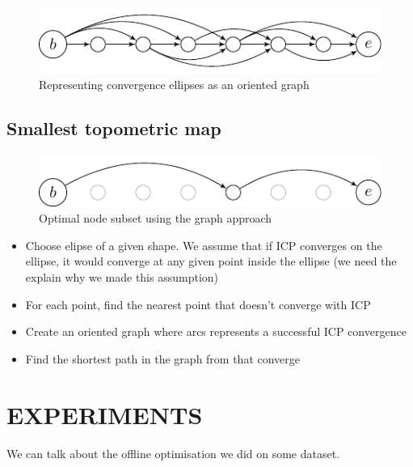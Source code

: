\documentclass[letterpaper,10 pt,conference]{ieeeconf}
\begin{document}
\begin{figure}[thpb]
  \centering
  \includegraphics[scale=1.0]{unoptimized-graph}
  \caption{Representing convergence ellipses as an oriented graph}
  \label{graph_unoptimized}
\end{figure}



\subsection{Smallest topometric map}

\begin{figure}[thpb]
  \centering
  \includegraphics[scale=1.0]{optimized-graph}
  \caption{Optimal node subset using the graph approach}
\end{figure}

\begin{itemize}
  \item Choose elipse of a given shape. We assume that if ICP converges on the
    ellipse, it would converge at any given point inside the ellipse (we need the explain why we made this assumption)

  \item For each point, find the nearest point that doesn't converge with ICP

  \item Create an oriented graph where arcs represents a successful ICP convergence

  \item Find the shortest path in the graph from that converge

\end{itemize}


\section{EXPERIMENTS}
We can talk about the offline optimisation we did on some dataset.
\end{document}
